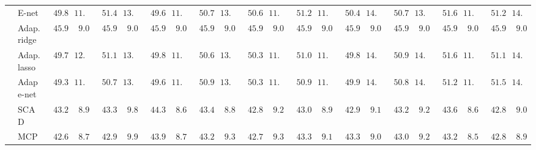 \begin{tabular}{llllllllllllllllllllll}
	& E-net  & $\phantom{0}49.845$ & $11.496$ & $\phantom{0}51.472$ & $13.209$ & $\phantom{0}49.694$ & $11.269$ & $\phantom{0}50.708$ & $13.092$ & $\phantom{0}50.656$ & $11.743$ & $\phantom{0}51.241$ & $11.019$ & $\phantom{0}50.481$ & $14.278$ & $\phantom{0}50.779$ & $13.210$ & $\phantom{0}51.672$ & $11.210$ & $\phantom{0}51.231$ & $14.713$ \\
	& Adap. ridge  & $\phantom{0}45.929$ & $\phantom{0}9.029$ & $\phantom{0}45.931$ & $\phantom{0}9.031$ & $\phantom{0}45.927$ & $\phantom{0}9.028$ & $\phantom{0}45.928$ & $\phantom{0}9.024$ & $\phantom{0}45.929$ & $\phantom{0}9.029$ & $\phantom{0}45.931$ & $\phantom{0}9.030$ & $\phantom{0}45.910$ & $\phantom{0}9.026$ & $\phantom{0}45.930$ & $\phantom{0}9.030$ & $\phantom{0}45.929$ & $\phantom{0}9.029$ & $\phantom{0}45.924$ & $\phantom{0}9.027$ \\
	& Adap. lasso  & $\phantom{0}49.766$ & $12.013$ & $\phantom{0}51.171$ & $13.663$ & $\phantom{0}49.877$ & $11.717$ & $\phantom{0}50.634$ & $13.144$ & $\phantom{0}50.368$ & $11.908$ & $\phantom{0}51.011$ & $11.779$ & $\phantom{0}49.827$ & $14.997$ & $\phantom{0}50.971$ & $14.396$ & $\phantom{0}51.624$ & $11.372$ & $\phantom{0}51.147$ & $14.622$ \\
	& Adap e-net  & $\phantom{0}49.376$ & $11.536$ & $\phantom{0}50.756$ & $13.102$ & $\phantom{0}49.693$ & $11.501$ & $\phantom{0}50.969$ & $13.234$ & $\phantom{0}50.312$ & $11.208$ & $\phantom{0}50.913$ & $11.215$ & $\phantom{0}49.949$ & $14.195$ & $\phantom{0}50.830$ & $14.061$ & $\phantom{0}51.289$ & $11.285$ & $\phantom{0}51.532$ & $14.793$ \\
	& SCAD  & $\phantom{0}43.214$ & $\phantom{0}8.960$ & $\phantom{0}43.307$ & $\phantom{0}9.860$ & $\phantom{0}44.382$ & $\phantom{0}8.653$ & $\phantom{0}43.487$ & $\phantom{0}8.861$ & $\phantom{0}42.873$ & $\phantom{0}9.203$ & $\phantom{0}43.071$ & $\phantom{0}8.978$ & $\phantom{0}42.996$ & $\phantom{0}9.187$ & $\phantom{0}43.217$ & $\phantom{0}9.251$ & $\phantom{0}43.650$ & $\phantom{0}8.623$ & $\phantom{0}42.850$ & $\phantom{0}9.022$ \\
	& MCP  & $\phantom{0}42.628$ & $\phantom{0}8.769$ & $\phantom{0}42.979$ & $\phantom{0}9.937$ & $\phantom{0}43.929$ & $\phantom{0}8.709$ & $\phantom{0}43.210$ & $\phantom{0}9.365$ & $\phantom{0}42.719$ & $\phantom{0}9.307$ & $\phantom{0}43.351$ & $\phantom{0}9.125$ & $\phantom{0}43.394$ & $\phantom{0}9.052$ & $\phantom{0}43.009$ & $\phantom{0}9.262$ & $\phantom{0}43.297$ & $\phantom{0}8.547$ & $\phantom{0}42.823$ & $\phantom{0}8.998$ \\

\end{tabular}
